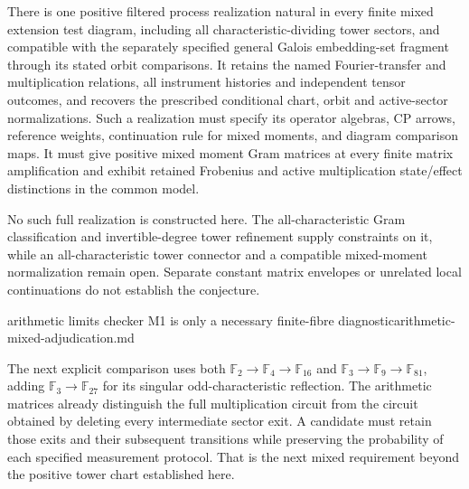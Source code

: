 \begin{conjecture}
\statusConjecture\quad
There is one positive filtered process realization natural in every finite
mixed extension test diagram, including all characteristic-dividing tower
sectors, and compatible with the separately specified general Galois
embedding-set fragment through its stated orbit comparisons. It retains
the named Fourier-transfer and multiplication relations, all instrument
histories and independent tensor outcomes, and recovers the prescribed
conditional chart, orbit and active-sector normalizations.
Such a realization must specify its operator algebras, CP arrows, reference
weights, continuation rule for mixed moments, and diagram comparison maps.
It must give positive mixed moment Gram matrices at every finite matrix
amplification and exhibit retained Frobenius and active multiplication
state/effect distinctions in the common model.
\end{conjecture}
\begin{scope}
No such full realization is constructed here. The all-characteristic Gram
classification and invertible-degree tower refinement supply constraints
on it, while an all-characteristic tower connector and a compatible
mixed-moment normalization remain open. Separate constant matrix envelopes
or unrelated local continuations do not establish the conjecture.
\end{scope}
{arithmetic limits checker M1 is only a necessary finite-fibre diagnostic}{arithmetic-mixed-adjudication.md}

The next explicit comparison uses both
$\mathbb F_2\to\mathbb F_4\to\mathbb F_{16}$ and
$\mathbb F_3\to\mathbb F_9\to\mathbb F_{81}$, adding
$\mathbb F_3\to\mathbb F_{27}$ for its singular odd-characteristic
reflection. The arithmetic matrices already distinguish the full
multiplication circuit from the circuit obtained by deleting every
intermediate sector exit. A candidate must retain those exits and their
subsequent transitions while preserving the probability of each specified
measurement protocol. That is the next mixed requirement beyond the
positive tower chart established here.

